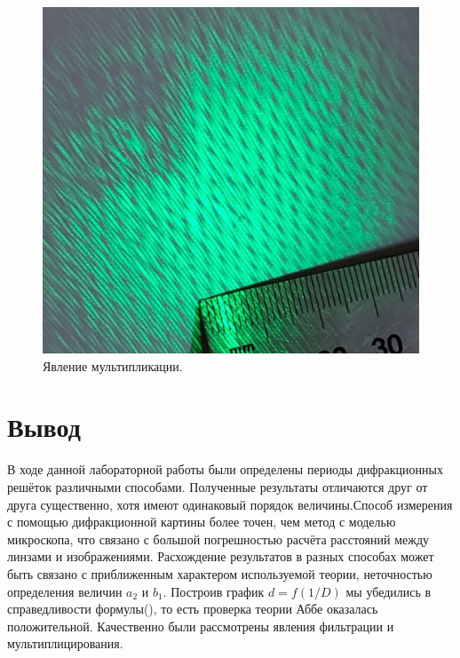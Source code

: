 \documentclass[a4paper,12pt]{article}
\begin{document}
\begin{enumerate}
\begin{figure}[h!]
\includegraphics[scale=0.17]{13.jpg}
\centering
\caption{Явление мультипликации.}
\end{figure}

\end{enumerate}

\section{Вывод}


В ходе данной лабораторной работы были определены периоды дифракционных решёток различными способами. Полученные результаты отличаются друг от друга существенно, хотя имеют одинаковый порядок величины.Способ измерения с помощью дифракционной картины более точен, чем метод с моделью микроскопа, что связано с большой погрешностью расчёта расстояний между линзами и изображениями. Расхождение результатов в разных способах может быть связано с приближенным характером используемой теории, неточностью определения величин $a_2$ и $b_1$.
Построив график $d = f(1/D)$ мы убедились в справедливости формулы(), то есть проверка теории Аббе оказалась положительной. Качественно были  рассмотрены явления фильтрации и мультиплицирования.
\end{document}
